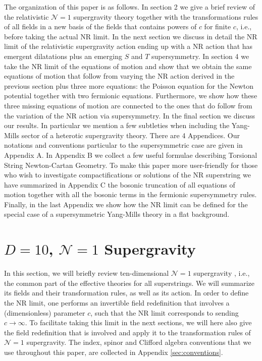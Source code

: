 \documentclass[a4paper,10pt,openany]{article}
\begin{document}
	
	The organization of this paper is as follows. In section 2 we give a brief review of the relativistic $\mathcal{N}=1$  supergravity theory together with the transformations rules of all fields in a new basis of the fields that contains powers of $c$ for finite $c$, i.e., before taking the actual NR limit. In the next section we discuss in detail the NR limit of the relativistic  supergravity action  ending up with a NR action that has emergent dilatations plus an emerging $S$ and $T$ supersymmetry.  In section 4 we take the  NR limit of the  equations of motion and show that we obtain the same equations of motion that follow from varying the NR action derived in the previous section  plus three more equations: the Poisson equation for the Newton potential together with two fermionic equations. Furthermore, we show how these three missing equations of motion are connected to the  ones that do follow from the variation of the NR action  via supersymmetry. In the final section we discuss our results. In particular we mention  a few subtleties when including the Yang-Mills sector of a heterotic supergravity theory. There are 4 Appendices.
	Our notations and conventions particular to the supersymmetric case are given in Appendix A. In Appendix B we collect a few useful formulae describing Torsional String Newton-Cartan Geometry. To make this paper more user-friendly for those  who wish to investigate compactifications or solutions of the NR superstring we have summarized in Appendix C the bosonic truncation of all equations of motion together with all the bosonic terms in the fermionic supersymmetry rules. Finally, in the last Appendix we show how the NR limit can be defined for the special case of a supersymmetric Yang-Mills theory in a flat background.
	
	\section{$D=10$, $\mathcal{N}=1$ Supergravity} \label{sec:Nisonesugra}
	
	In this section, we will briefly review ten-dimensional $\mathcal{N}=1$ supergravity \cite{Bergshoeff:1981um,Chamseddine:1980cp}, i.e., the common part of the effective theories for all superstrings. We will summarize its fields and their transformation rules, as well as its action. In order to define the NR limit, one performs an invertible field redefinition that involves a (dimensionless) parameter $c$, such that the NR limit corresponds to sending $c \rightarrow \infty$. To facilitate taking this limit in the next sections, we will here also give the field redefinition that is involved and apply it to the transformation rules of $\mathcal{N}=1$ supergravity. The index, spinor and Clifford algebra conventions that we use throughout this paper, are collected in Appendix \ref{sec:conventions}.
	
\end{document}
